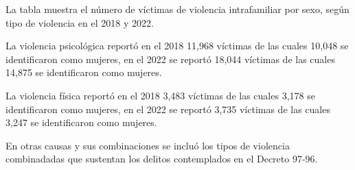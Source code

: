 La tabla muestra el número de víctimas de violencia intrafamiliar por sexo, según tipo de violencia en el 2018 y 2022. 

La violencia psicológica reportó en el 2018 11,968 víctimas de las cuales 10,048 se identificaron como mujeres, en el 2022 se reportó 18,044 víctimas de las cuales 14,875 se identificaron como mujeres. 

La violencia física reportó en el 2018 3,483 víctimas de las cuales 3,178 se identificaron como mujeres, en el 2022 se reportó 3,735 víctimas de las cuales 3,247 se identificaron como mujeres. 

En otras causas y sus combinaciones se incluó los tipos de violencia combinadadas que sustentan los delitos contemplados en el Decreto 97-96.